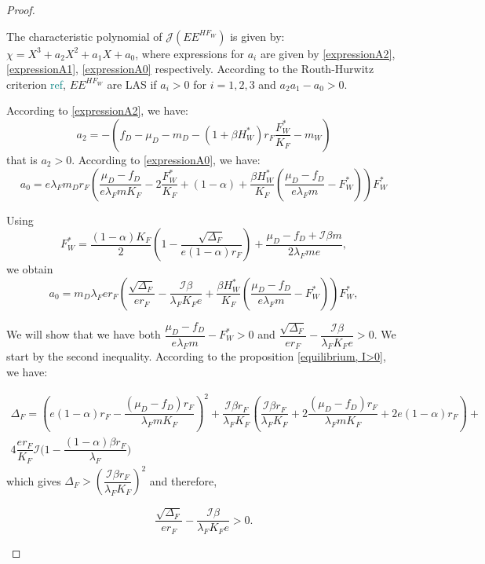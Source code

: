 \documentclass{article}
\newcommand{\lfw}{\lambda_{F}}
\newcommand{\lfw}{\lambda_{F}}
\newcommand{\cI}{\mathcal{I}}
\newcommand{\marc}[1]{\textcolor{teal}{#1}}
\begin{document}
\begin{proof}
\begin{itemize}
The characteristic polynomial of $\mathcal{J}(EE^{H F_W})$ is given by: $\chi = X^3 + a_2 X^2 + a_1 X + a_0$, where expressions for $a_i$ are given by \eqref{expressionA2}, \eqref{expressionA1}, \eqref{expressionA0} respectively. According to the Routh-Hurwitz criterion \marc{ref}, $EE^{H F_W}$ are LAS if $a_i > 0$ for $i=1,2,3$ and $a_2 a_1 - a_0 > 0$.

According to \eqref{expressionA2}, we have:
\begin{equation*}
a_2 = -\left(f_D - \mu_D - m_D - (1+\beta H_W^*)r_F \dfrac{F_W^*}{K_F} - m_W \right)
\end{equation*}
that is $a_2>0$. According to \eqref{expressionA0}, we have:
\begin{equation*}
a_0 = e \lfw m_D r_F \left(\dfrac{\mu_D -f_D }{e \lfw m K_F} - 2\dfrac{F_W^*}{K_F} + (1-\alpha) + \dfrac{\beta H_W^*}{K_F} \left(\dfrac{\mu_D -f_D }{e \lfw m} - F_W^*\right) \right) F_W^*
\end{equation*}

Using
\begin{equation*}
F_W^* = \dfrac{(1-\alpha)K_F}{2}\left(1 - \dfrac{\sqrt{\Delta_F}}{e(1-\alpha)r_F}\right) + \dfrac{\mu_D - f_D + \cI \beta m}{2\lfw m e},
\end{equation*}
we obtain
\begin{equation*}
a_0 = m_D \lfw e r_F \left(\dfrac{\sqrt{\Delta_F}}{er_F} - \dfrac{\cI \beta}{\lfw K_F e} +  \dfrac{\beta H_W^*}{K_F} \left(\dfrac{\mu_D -f_D }{e \lfw m} - F_W^*\right)\right)  F^*_{W},
\end{equation*}

We will show that we have both $\dfrac{\mu_D -f_D }{e \lfw m} - F_W^* > 0$ and $\dfrac{\sqrt{\Delta_F}}{er_F} - \dfrac{\cI \beta}{\lfw K_F e} > 0$. We start by the second inequality. According to the proposition \ref{equilibrium, I>0}, we have:

\begin{multline*}
\Delta_F = \left(e(1-\alpha)r_F - \dfrac{(\mu_D - f_D) r_F}{\lfw m K_F}\right)^2 + \dfrac{\cI \beta r_F}{\lfw K_F} \left(\dfrac{\cI \beta r_F}{\lfw K_F} + 2\dfrac{(\mu_D - f_D) r_F}{\lfw m K_F} + 2e(1-\alpha)r_F \right) + \\ 4\dfrac{er_F}{K_F}  \cI\Big(1 - \dfrac{(1-\alpha)\beta r_F}{\lfw} \Big)
\end{multline*}
 which gives $\Delta_F > \left(\dfrac{\cI \beta r_F}{\lfw K_F}\right)^2$ and therefore,

\begin{equation*}
\dfrac{\sqrt{\Delta_F}}{er_F} - \dfrac{\cI \beta}{\lfw K_F e} > 0.
\end{equation*}


\end{itemize}
\end{proof}
\end{document}
